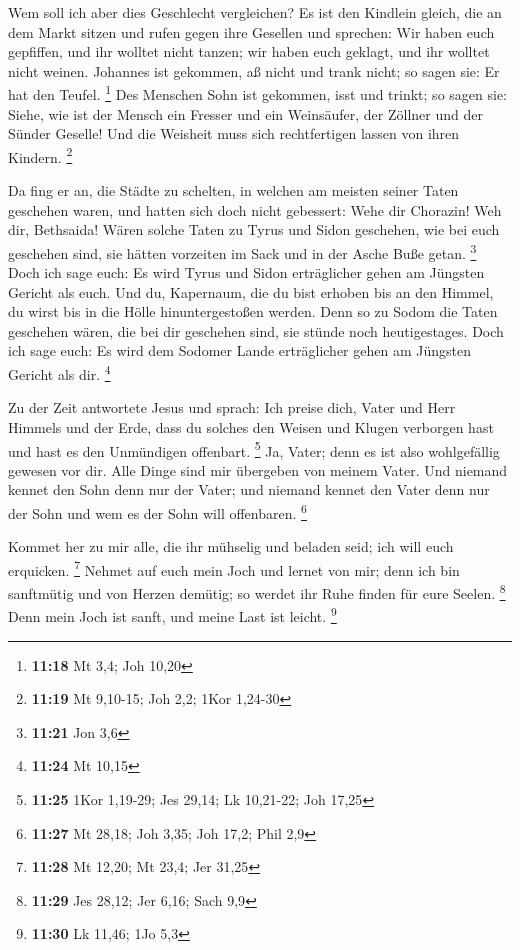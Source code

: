  Wem soll ich aber dies Geschlecht vergleichen? Es ist
den Kindlein gleich, die an dem Markt sitzen und rufen gegen ihre
Gesellen  und sprechen: Wir haben euch gepfiffen, und ihr
wolltet nicht tanzen; wir haben euch geklagt, und ihr wolltet nicht
weinen.  Johannes ist gekommen, aß nicht und trank nicht;
so sagen sie: Er hat den Teufel. \footnote{\textbf{11:18} Mt 3,4; Joh
  10,20}  Des Menschen Sohn ist gekommen, isst und
trinkt; so sagen sie: Siehe, wie ist der Mensch ein Fresser und ein
Weinsäufer, der Zöllner und der Sünder Geselle! Und die Weisheit muss
sich rechtfertigen lassen von ihren Kindern. \footnote{\textbf{11:19} Mt
  9,10-15; Joh 2,2; 1Kor 1,24-30}

 Da fing er an, die Städte zu schelten, in welchen am
meisten seiner Taten geschehen waren, und hatten sich doch nicht
gebessert:  Wehe dir Chorazin! Weh dir, Bethsaida! Wären
solche Taten zu Tyrus und Sidon geschehen, wie bei euch geschehen sind,
sie hätten vorzeiten im Sack und in der Asche Buße getan. \footnote{\textbf{11:21}
  Jon 3,6}  Doch ich sage euch: Es wird Tyrus und Sidon
erträglicher gehen am Jüngsten Gericht als euch.  Und du,
Kapernaum, die du bist erhoben bis an den Himmel, du wirst bis in die
Hölle hinuntergestoßen werden. Denn so zu Sodom die Taten geschehen
wären, die bei dir geschehen sind, sie stünde noch heutigestages.
 Doch ich sage euch: Es wird dem Sodomer Lande
erträglicher gehen am Jüngsten Gericht als dir. \footnote{\textbf{11:24}
  Mt 10,15}

 Zu der Zeit antwortete Jesus und sprach: Ich preise
dich, Vater und Herr Himmels und der Erde, dass du solches den Weisen
und Klugen verborgen hast und hast es den Unmündigen offenbart.
\footnote{\textbf{11:25} 1Kor 1,19-29; Jes 29,14; Lk 10,21-22; Joh 17,25}
 Ja, Vater; denn es ist also wohlgefällig gewesen vor
dir.  Alle Dinge sind mir übergeben von meinem Vater. Und
niemand kennet den Sohn denn nur der Vater; und niemand kennet den Vater
denn nur der Sohn und wem es der Sohn will offenbaren. \footnote{\textbf{11:27}
  Mt 28,18; Joh 3,35; Joh 17,2; Phil 2,9}

 Kommet her zu mir alle, die ihr mühselig und beladen
seid; ich will euch erquicken. \footnote{\textbf{11:28} Mt 12,20; Mt
  23,4; Jer 31,25}  Nehmet auf euch mein Joch und lernet
von mir; denn ich bin sanftmütig und von Herzen demütig; so werdet ihr
Ruhe finden für eure Seelen. \footnote{\textbf{11:29} Jes 28,12; Jer
  6,16; Sach 9,9}  Denn mein Joch ist sanft, und meine
Last ist leicht. \footnote{\textbf{11:30} Lk 11,46; 1Jo 5,3}

